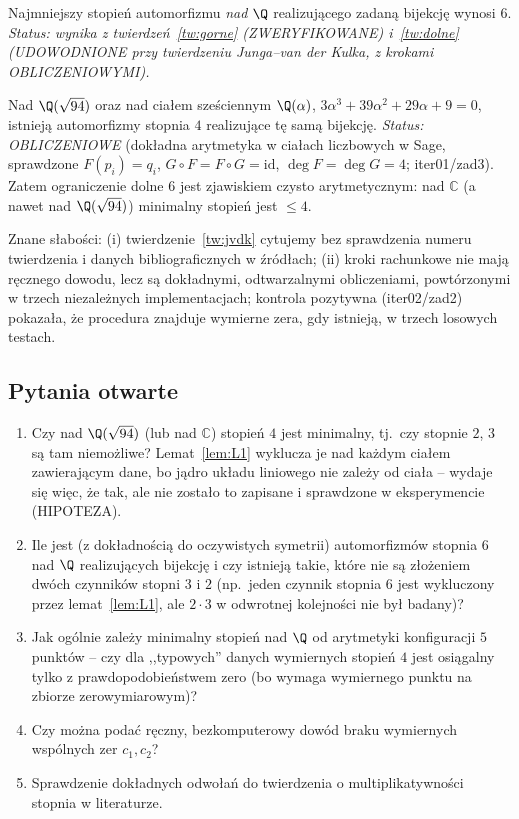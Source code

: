 \begin{stwierdzenie}
Najmniejszy stopień automorfizmu \emph{nad $\Q$} realizującego zadaną bijekcję wynosi $6$.
\emph{Status: wynika z twierdzeń~\ref{tw:gorne} (ZWERYFIKOWANE) i~\ref{tw:dolne}
(UDOWODNIONE przy twierdzeniu Junga--van der Kulka, z krokami OBLICZENIOWYMI).}
\end{stwierdzenie}

\begin{stwierdzenie}
Nad $\Q(\sqrt{94})$ oraz nad ciałem sześciennym $\Q(\alpha)$, $3\alpha^3+39\alpha^2+29\alpha+9=0$,
istnieją automorfizmy stopnia $4$ realizujące tę samą bijekcję.
\emph{Status: OBLICZENIOWE} (dokładna arytmetyka w ciałach liczbowych w Sage, sprawdzone
$F(p_i)=q_i$, $G\circ F=F\circ G=\mathrm{id}$, $\deg F=\deg G=4$; iter01/zad3).
Zatem ograniczenie dolne $6$ jest zjawiskiem czysto arytmetycznym: nad $\mathbb{C}$ (a nawet nad
$\Q(\sqrt{94})$) minimalny stopień jest $\le4$.
\end{stwierdzenie}

\begin{uwaga}\label{uw:luka}
Znane słabości: (i) twierdzenie~\ref{tw:jvdk} cytujemy bez sprawdzenia numeru twierdzenia i danych
bibliograficznych w źródłach; (ii) kroki rachunkowe nie mają ręcznego dowodu, lecz są dokładnymi,
odtwarzalnymi obliczeniami, powtórzonymi w trzech niezależnych implementacjach; kontrola pozytywna
(iter02/zad2) pokazała, że procedura znajduje wymierne zera, gdy istnieją, w trzech losowych testach.
\end{uwaga}

\subsection*{Pytania otwarte}
\begin{enumerate}
\item Czy nad $\Q(\sqrt{94})$ (lub nad $\mathbb{C}$) stopień $4$ jest minimalny, tj.\ czy stopnie
  $2$, $3$ są tam niemożliwe? Lemat~\ref{lem:L1} wyklucza je nad każdym ciałem zawierającym dane,
  bo jądro układu liniowego nie zależy od ciała -- wydaje się więc, że tak, ale nie zostało to
  zapisane i sprawdzone w eksperymencie (HIPOTEZA).
\item Ile jest (z dokładnością do oczywistych symetrii) automorfizmów stopnia $6$ nad $\Q$ realizujących
  bijekcję i czy istnieją takie, które nie są złożeniem dwóch czynników stopni $3$ i $2$ (np.\ jeden
  czynnik stopnia 6 jest wykluczony przez lemat~\ref{lem:L1}, ale $2\cdot3$ w odwrotnej kolejności nie
  był badany)?
\item Jak ogólnie zależy minimalny stopień nad $\Q$ od arytmetyki konfiguracji $5$ punktów -- czy dla
  ,,typowych'' danych wymiernych stopień $4$ jest osiągalny tylko z prawdopodobieństwem zero
  (bo wymaga wymiernego punktu na zbiorze zerowymiarowym)?
\item Czy można podać ręczny, bezkomputerowy dowód braku wymiernych wspólnych zer $c_1,c_2$?
\item Sprawdzenie dokładnych odwołań do twierdzenia o multiplikatywności stopnia w literaturze.
\end{enumerate}
